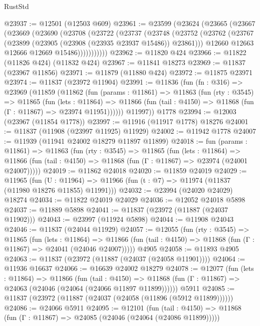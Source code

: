 \begin{lexlean}{RustStd}
\begin{coremodule}
@23937 := @12501 (@12503 @609)
@23961 := @23599
    (@23624
      (@23665
        (@23667
          (@23669
            (@23690
              (@23708
                (@23722
                  (@23737
                    (@23748
                      (@23752
                        (@23762
                          (@23767 (@23899 (@23905 (@23908 (@23935 @23937 @15486)) @23861)))
                          @12660
                          @12663
                          @12666
                          @12669
                          @15486)))))))))))
@23962 := @11820 @424
@23966 := @11822 (@11826 @424) (@11832 @424)
@23967 := @11841 @18273
@23969 := @11837 (@23967 @11856)
@23971 := @11879 (@11880 @424)
@23972 := @11875 @23971
@23974 := @11837 (@23972 @11904)
@23991 := @11836
    (fun (fn : @316) =>
    @23969
      (@11859
        (@11862
          (fun (params : @11861) =>
          @11863
            (fun (rty : @3545) =>
            @11865
              (fun (lets : @11864) =>
              @11866 (fun (tail : @4150) => @11868 (fun (Γ : @11867) => @23974 @11951))))))
        @11997))
    @1778
@23994 := @12003 (@23967 (@11854 @1778))
@23997 := @11916 (@11917 @1778) @18276
@24001 := @11837 (@11908 (@23997 @11925) @11929)
@24002 := @11942 @1778
@24007 := @11939 (@11941 @24002 @18279 @11897 @11899)
@24018 := fun (params : @11861) =>
  @11863
    (fun (rty : @3545) =>
    @11865
      (fun (lets : @11864) =>
      @11866 (fun (tail : @4150) => @11868 (fun (Γ : @11867) => @23974 (@24001 @24007)))))
@24019 := @11862 @24018
@24020 := @11859 @24019
@24029 := @11965
    (fun (U : @11964) => @11966 (fun (t : @7) => @11974 (@11837 (@11980 @18276 @11855) @11991)))
@24032 := @23994 (@24020 @24029) @18274
@24034 := @11822 @24019 @24029
@24036 := @12052 @24018 @5898
@24037 := @11889 @5898
@24041 := @11837 (@23972 (@11887 (@24037 @11902)))
@24043 := @23997 (@11924 @5898)
@24044 := @11908 @24043
@24046 := @11837 (@24044 @11929)
@24057 := @12055
    (fun (rty : @3545) =>
    @11865
      (fun (lets : @11864) =>
      @11866 (fun (tail : @4150) => @11868 (fun (Γ : @11867) => @24041 (@24046 @24007)))))
    @4905
@24058 := @11893 @4905
@24063 := @11837 (@23972 (@11887 (@24037 (@24058 @11901))))
@24064 := @11936 @16637
@24066 := @16639 @24002 @18279
@24078 := @12077
    (fun (lets : @11864) =>
    @11866
      (fun (tail : @4150) =>
      @11868 (fun (Γ : @11867) => @24063 (@24046 (@24064 (@24066 @11897 @11899))))))
    @5911
@24085 := @11837 (@23972 (@11887 (@24037 (@24058 (@11896 (@5912 @11899))))))
@24086 := @24066 @5911
@24095 := @12101
    (fun (tail : @4150) => @11868 (fun (Γ : @11867) => @24085 (@24046 (@24064 (@24086 @11899)))))

\end{coremodule}
\end{lexlean}

